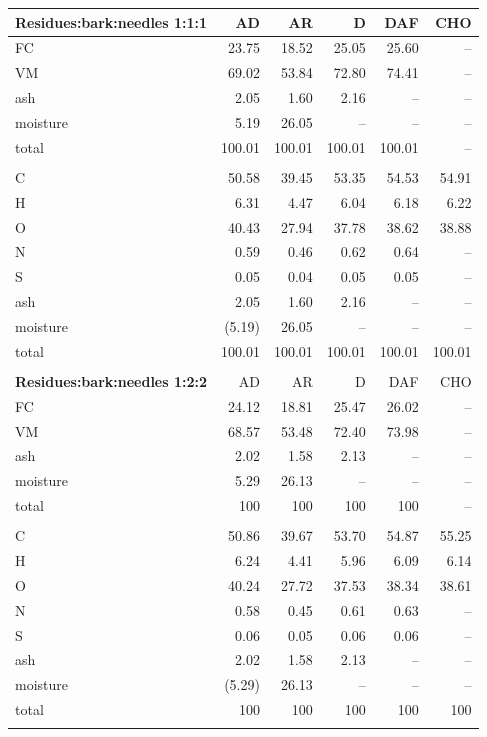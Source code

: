 \begin{longtable}{lrrrrr}
    \textbf{Residues:bark:needles 1:1:1} & AD & AR & D & DAF & CHO \\
    \midrule
    FC       & 23.75  & 18.52  & 25.05  & 25.60  & -- \\
    VM       & 69.02  & 53.84  & 72.80  & 74.41  & -- \\
    ash      & 2.05   & 1.60   & 2.16   & --     & -- \\
    moisture & 5.19   & 26.05  & --     & --     & -- \\
    total    & 100.01 & 100.01 & 100.01 & 100.01 & -- \\
    \\
    C        & 50.58  & 39.45  & 53.35  & 54.53  & 54.91 \\
    H        & 6.31   & 4.47   & 6.04   & 6.18   & 6.22 \\
    O        & 40.43  & 27.94  & 37.78  & 38.62  & 38.88 \\
    N        & 0.59   & 0.46   & 0.62   & 0.64   & -- \\
    S        & 0.05   & 0.04   & 0.05   & 0.05   & -- \\
    ash      & 2.05   & 1.60   & 2.16   & --     & -- \\
    moisture & (5.19) & 26.05  & --     & --     & -- \\
    total    & 100.01 & 100.01 & 100.01 & 100.01 & 100.01 \\
    \\

    \textbf{Residues:bark:needles 1:2:2} & AD & AR & D & DAF & CHO \\
    \midrule
    FC       & 24.12  & 18.81  & 25.47  & 26.02  & -- \\
    VM       & 68.57  & 53.48  & 72.40  & 73.98  & -- \\
    ash      & 2.02   & 1.58   & 2.13   & --     & -- \\
    moisture & 5.29   & 26.13  & --     & --     & -- \\
    total    & 100    & 100    & 100    & 100    & -- \\
    \\
    C        & 50.86  & 39.67  & 53.70  & 54.87  & 55.25 \\
    H        & 6.24   & 4.41   & 5.96   & 6.09   & 6.14 \\
    O        & 40.24  & 27.72  & 37.53  & 38.34  & 38.61 \\
    N        & 0.58   & 0.45   & 0.61   & 0.63   & -- \\
    S        & 0.06   & 0.05   & 0.06   & 0.06   & -- \\
    ash      & 2.02   & 1.58   & 2.13   & --     & -- \\
    moisture & (5.29) & 26.13  & --     & --     & -- \\
    total    & 100    & 100    & 100    & 100    & 100 \\
    \\


\end{longtable}
